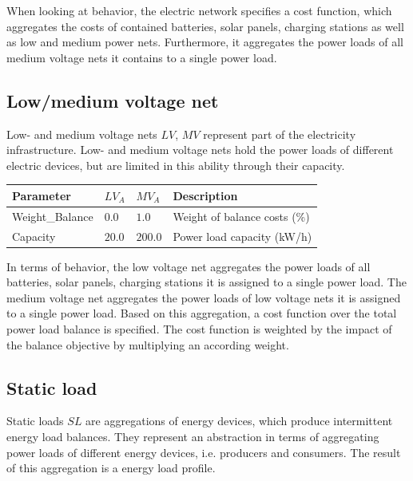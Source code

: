 When looking at behavior, the electric network specifies a cost function, which aggregates the costs of contained batteries, solar panels, charging stations as well as low and medium power nets. Furthermore, it aggregates the power loads of all medium voltage nets it contains to a single power load.

\subsection{Low/medium voltage net}

Low- and medium voltage nets $LV$, $MV$ represent part of the electricity infrastructure. Low- and medium voltage nets hold the power loads of different electric devices, but are limited in this ability through their capacity.

\begin{table}[h]
	\renewcommand{\arraystretch}{1.3}
	\centering
	\begin{tabular}{llll}
		\hline
		\textbf{Parameter}   & \textbf{$LV_{A}$} & \textbf{$MV_{A}$}  & Description \\ \hline
		Weight\_Balance       & $0.0$ & $1.0$ & Weight of balance costs (\%) \\  
		Capacity          & $20.0$ & $200.0$ & Power load capacity (kW/h)     \\ \hline
	\end{tabular}
\end{table}

In terms of behavior, the low voltage net aggregates the power loads of all batteries, solar panels, charging stations it is assigned to a single power load. The medium voltage net aggregates the power loads of low voltage nets it is assigned to a single power load. Based on this aggregation, a cost function over the total power load balance is specified. The cost function is weighted by the impact of the balance objective by multiplying an according weight.

\subsection{Static load}

Static loads $SL$ are aggregations of energy devices, which produce intermittent energy load balances. They represent an abstraction in terms of aggregating power loads of different energy devices, i.e. producers and consumers. The result of this aggregation is a energy load profile.

